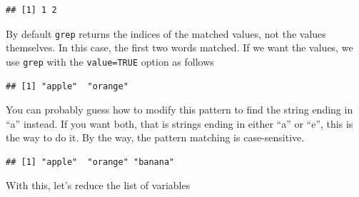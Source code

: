 \documentclass[openany]{book}
\newenvironment{Shaded}{\begin{snugshade}}{\end{snugshade}}
\newcommand{\DataTypeTok}[1]{\textcolor[rgb]{0.13,0.29,0.53}{#1}}
\newcommand{\KeywordTok}[1]{\textcolor[rgb]{0.13,0.29,0.53}{\textbf{#1}}}
\newcommand{\NormalTok}[1]{#1}
\newcommand{\OperatorTok}[1]{\textcolor[rgb]{0.81,0.36,0.00}{\textbf{#1}}}
\newcommand{\OtherTok}[1]{\textcolor[rgb]{0.56,0.35,0.01}{#1}}
\newcommand{\StringTok}[1]{\textcolor[rgb]{0.31,0.60,0.02}{#1}}
\begin{document}
\begin{verbatim}
## [1] 1 2
\end{verbatim}

By default \texttt{grep} returns the indices of the matched values, not the values themselves. In this case, the first two words matched. If we want the values, we use \texttt{grep} with the \texttt{value=TRUE} option as follows

\begin{Shaded}
\end{Shaded}

\begin{verbatim}
## [1] "apple"  "orange"
\end{verbatim}

You can probably guess how to modify this pattern to find the string ending in ``a'' instead. If you want both, that is strings ending in either ``a'' or ``e'', this is the way to do it. By the way, the pattern matching is case-sensitive.

\begin{Shaded}
\end{Shaded}

\begin{verbatim}
## [1] "apple"  "orange" "banana"
\end{verbatim}

With this, let's reduce the list of variables

\begin{Shaded}
\end{Shaded}
\end{document}
